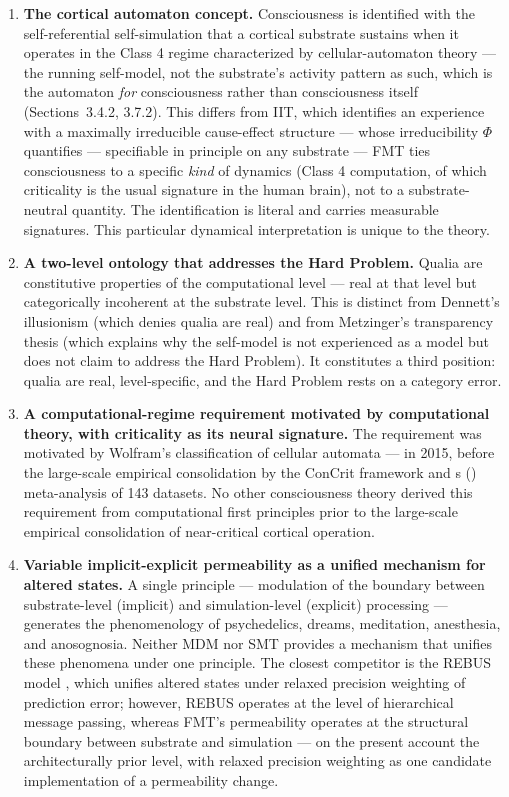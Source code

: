 \documentclass[12pt]{article}
\newcommand{\rev}[1]{#1}
\begin{document}
\begin{enumerate}
\item \textbf{The cortical automaton concept.} Consciousness is identified with the self-referential self-simulation that a cortical substrate sustains when it operates in the Class 4 regime characterized by cellular-automaton theory --- the running self-model, not the substrate's activity pattern as such, which is the automaton \emph{for} consciousness rather than consciousness itself (Sections~3.4.2, 3.7.2). This differs from IIT, which identifies an experience with a maximally irreducible cause-effect structure --- whose irreducibility $\Phi$ quantifies --- specifiable in principle on any substrate --- FMT ties consciousness to a specific \emph{kind} of dynamics (Class 4 computation, of which criticality is the usual signature in the human brain), not to a substrate-neutral quantity. The identification is literal and carries measurable signatures. This particular dynamical interpretation is unique to the theory.
\item \textbf{A two-level ontology that addresses the Hard Problem.} Qualia are constitutive properties of the computational level --- real at that level but categorically incoherent at the substrate level. This is distinct from Dennett's illusionism (which denies qualia are real) and from Metzinger's transparency thesis (which explains why the self-model is not experienced as a model but does not claim to address the Hard Problem). It constitutes a third position: qualia are real, level-specific, and the Hard Problem rests on a category error.
\item \textbf{A computational-regime requirement \rev{motivated} by computational theory, with criticality as its neural signature.} The requirement was \rev{motivated} by Wolfram's classification of cellular automata \citep{Wolfram2002} --- in 2015, \rev{before the large-scale empirical consolidation} by the ConCrit framework \citep{AlgomShriki2026} and \citeauthor{HengenShew2025}\textquotesingle s (\citeyear{HengenShew2025}) meta-analysis of 143 datasets. No other consciousness theory derived this requirement from computational first principles prior to \rev{the large-scale empirical consolidation of near-critical cortical operation}.
\item \textbf{Variable implicit-explicit permeability as a unified mechanism for altered states.} A single principle --- modulation of the boundary between substrate-level (implicit) and simulation-level (explicit) processing --- generates the phenomenology of psychedelics, dreams, meditation, anesthesia, and anosognosia. Neither MDM nor SMT provides a mechanism that unifies these phenomena under one principle. The closest competitor is the REBUS model \citep{CarhartHarris2019}, which unifies altered states under relaxed precision weighting of prediction error; however, REBUS operates at the level of hierarchical message passing, whereas FMT's permeability operates at the structural boundary between substrate and simulation --- on the present account the architecturally prior level, with relaxed precision weighting as one candidate implementation of a permeability change.

\end{enumerate}
\end{document}

